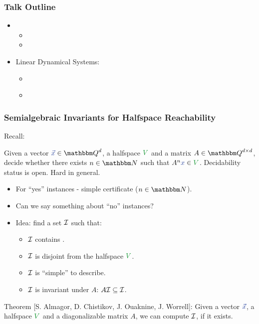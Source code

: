 \begin{frame}
\frametitle{Talk Outline}
\begin{itemize}
	\item {}
	\begin{itemize} 
		\item {}
		\item {}
	\end{itemize}
	\item Linear Dynamical Systems: 
	\begin{itemize}
	\item {}
	\item[\itemnow] \textbf{}
	\end{itemize}
\end{itemize}
\end{frame}

\begin{frame}
	\frametitle{Semialgebraic Invariants for Halfspace Reachability}
	Recall:
	\begin{beamerboxesrounded}[upper=lowercoldarkred,lower=uppercoldarkred,shadow=true]
		{Given a vector $\colInit{\vec{x}}\in \QQ^d$, a halfspace $\colTarget{V}$ and a matrix $A\in \QQ^{d\times d}$, decide whether there exists $n\in \NN$ such that $A^n\colInit{x}\in \colTarget{V}$.}
			Decidability status is open. Hard in general. 
	\end{beamerboxesrounded}
	\vspace*{-18pt}
	\onslide<+->
	\begin{itemize}
		\item<+-> For ``yes'' instances - simple certificate ($n\in \NN$).
		\item<+-> Can we say something about ``no'' instances? 
		\item<+-> Idea: find a set ${\cal I}$ such that:
		\begin{itemize}
			\item ${\cal I}$ contains \alt<1-5>{the orbit $\set{A^n \colInit{\vec{x}}:n\in \NN}$}{$\colInit{\vec{x}}$}.
			\item ${\cal I}$ is disjoint from the halfspace $\colTarget{V}$.
			\item ${\cal I}$ is ``simple'' to describe.
			\item<+-> ${\cal I}$ is invariant under $A$: $A{\cal I}\subseteq {\cal I}$.
		\end{itemize} 
	\end{itemize}
	\onslide<+->	
	\onslide<+->
	\begin{beamerboxesrounded}[upper=uppercolgreen,lower=lowercolgreen,shadow=true]{Theorem [S. Almagor, D. Chistikov, J. Ouaknine, J. Worrell]:}
		{Given a vector $\colInit{\vec{x}}$, a halfspace $\colTarget{V}$ and a diagonalizable matrix $A$, we can compute ${\cal I}$, if it exists.}
	\end{beamerboxesrounded}	
\end{frame}

